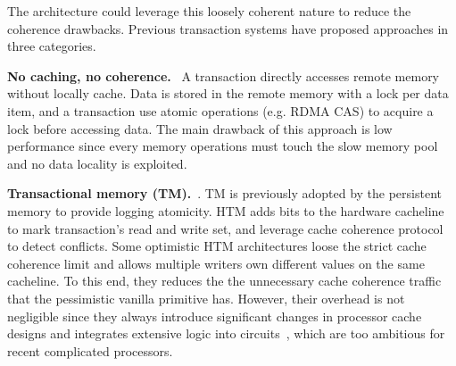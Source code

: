 The architecture could leverage this loosely coherent nature to reduce the coherence drawbacks. Previous transaction systems have proposed approaches in three categories. 


\noindent \textbf{No caching, no coherence.}~\cite{farm_nsdi14, fasst, drtm, drtmh, thecase_vldb22, compromise} A transaction directly accesses remote memory without locally cache. Data is stored in the remote memory with a lock per data item, and a transaction use atomic operations (e.g. RDMA CAS) to acquire a lock before accessing data. The main drawback of this approach is low performance since every memory operations must touch the slow memory pool and no data locality is exploited. 



\noindent \textbf{Transactional memory (TM).}~\cite{STM, HTM}. TM is previously adopted by the persistent memory to provide logging atomicity. 
HTM adds bits to the hardware cacheline to mark transaction's read and write set, and leverage cache coherence protocol to detect conflicts. Some optimistic HTM architectures loose the strict cache coherence limit and allows multiple writers own different values on the same cacheline. To this end, they reduces the the unnecessary cache coherence traffic that the pessimistic vanilla primitive has. However, their overhead is not negligible since they always introduce significant changes in processor cache designs and integrates extensive logic into circuits~\cite{munin_ppopp90, tcc_isca04, vtm_isca05, threadmarks_tc94, rtm_isca07, overlaytm_pact19}, which are too ambitious for recent complicated processors. 



